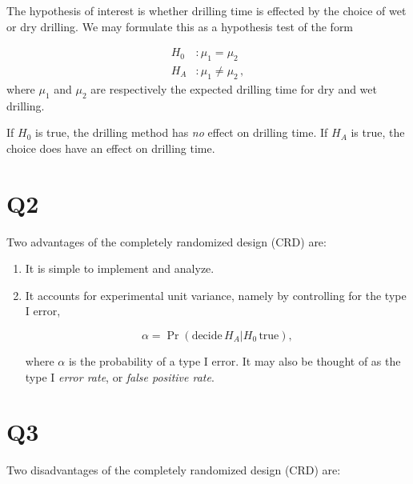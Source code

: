 \documentclass[
  11pt,
]{article}
\begin{document}
The hypothesis of interest is whether drilling time is effected by the
choice of wet or dry drilling. We may formulate this as a hypothesis
test of the form

\begin{align*}
  H_0 &: \mu_1 = \mu_2\\
  H_A &: \mu_1 \neq \mu_2\,,
\end{align*} where \(\mu_1\) and \(\mu_2\) are respectively the expected
drilling time for dry and wet drilling.

If \(H_0\) is true, the drilling method has \emph{no} effect on drilling
time. If \(H_A\) is true, the choice does have an effect on drilling
time.

\hypertarget{q2}{%
\section{Q2}\label{q2}}


Two advantages of the completely randomized design (CRD) are:

\begin{enumerate}
\def\labelenumi{\arabic{enumi}.}
\item
  It is simple to implement and analyze.
\item
  It accounts for experimental unit variance, namely by controlling for
  the type I error,

  \[
      \alpha = \Pr(\text{decide} \, H_A | H_0 \, \text{true}),
  \]

  where \(\alpha\) is the probability of a type I error. It may also be
  thought of as the type I \emph{error rate}, or
  \emph{false positive rate}.
\end{enumerate}

\hypertarget{q3}{%
\section{Q3}\label{q3}}


Two disadvantages of the completely randomized design (CRD) are:
\end{document}
